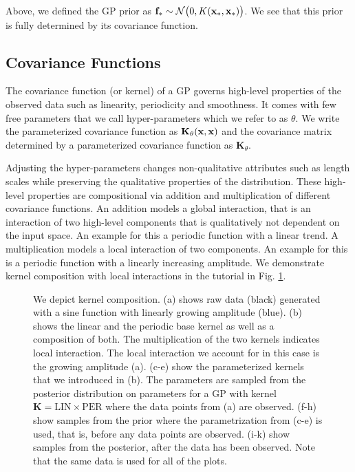Above, we defined the \ac{GP} prior as $\mathbf{f}_* \sim \mathcal{N}\big(0,K(\mathbf{x}_*,\mathbf{x}_*)\big)$.
We see that this prior is fully determined by its covariance function.
\subsection{Covariance Functions}
The covariance function (or kernel) of a \ac{GP} governs high-level properties of the observed data such as linearity, periodicity and smoothness.
It comes with few free parameters that we call hyper-parameters which we refer to as $\theta$.
We write the parameterized covariance function as $\mathbf{K}_{\theta}(\mathbf{x},\mathbf{x})$ and the
covariance matrix determined by a parameterized covariance function as $\mathbf{K}_{\theta}$.

Adjusting the hyper-parameters changes non-qualitative attributes such as length
scales while preserving the qualitative properties of the distribution.
These high-level properties are compositional via addition and multiplication of different covariance functions. An addition models a global interaction, that is an interaction of two high-level components that is qualitatively not dependent on the input space. An example for this a periodic function with a linear trend.
A multiplication models a local interaction of two components. 
An example for this is a periodic function with a linearly increasing amplitude. We demonstrate kernel composition with local interactions in the tutorial in Fig. \ref{fig:composition_tutorial}. 


\begin{figure}

\caption{We depict kernel composition. 
(a) shows raw data (black) generated with a sine function with linearly growing amplitude (blue). 
(b) shows the linear and the periodic base kernel as well as a composition of both. 
The multiplication of the two kernels indicates local interaction. The local interaction we account for in this case is the growing amplitude (a). (c-e) show the parameterized kernels that we introduced in (b).
The parameters are sampled from the posterior distribution on parameters for a \ac{GP} with kernel $\mathbf{K}=\text{LIN} \times \text{PER}$ where the data points from (a) are observed.
(f-h) show samples from the prior where the parametrization from (c-e) is used, that is, before any data points are observed.
(i-k) show samples from the posterior, after the data has been observed. Note that the same data is used for all of the plots.}
\label{fig:composition_tutorial}
\end{figure}

